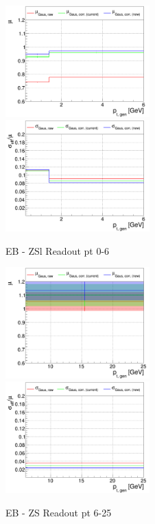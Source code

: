 \begin{figure}
\includegraphics[width=0.495\textwidth]{./ECAL_plots/plotsNOPU/EB/ZS/pdf/GENPT/EBZS_GENPT_0000_0006_MuOverBins.pdf}
\includegraphics[width=0.495\textwidth]{./ECAL_plots/plotsNOPU/EB/ZS/pdf/GENPT/EBZS_GENPT_0000_0006_EffSigmaOverBins.pdf}
\caption{EB - ZSl Readout pt 0-6}
\end{figure}

\begin{figure}
\includegraphics[width=0.495\textwidth]{./ECAL_plots/plotsNOPU/EB/ZS/pdf/GENPT/EBZS_GENPT_0006_0025_MuOverBins.pdf}
\includegraphics[width=0.495\textwidth]{./ECAL_plots/plotsNOPU/EB/ZS/pdf/GENPT/EBZS_GENPT_0006_0025_EffSigmaOverBins.pdf}
\caption{EB - ZS Readout pt 6-25}
\end{figure}

